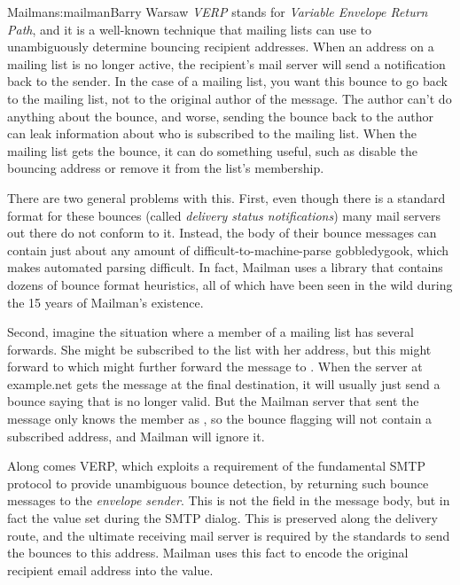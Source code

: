 \begin{aosachapter}{Mailman}{s:mailman}{Barry Warsaw}
\emph{VERP} stands for \emph{Variable Envelope Return Path}, and it is a well-known
technique that mailing lists can use to unambiguously determine bouncing
recipient addresses.  When an address on a mailing list is no longer active,
the recipient's mail server will send a notification back to the sender.  In
the case of a mailing list, you want this bounce to go back to the mailing
list, not to the original author of the message.  The author can't do anything
about the bounce, and worse, sending the bounce back to the author can leak
information about who is subscribed to the mailing list.  When the mailing
list gets the bounce, it can do something useful, such as disable the bouncing
address or remove it from the list's membership.

There are two general problems with this.  First, even though there is a
standard format for these bounces (called \emph{delivery status notifications})
many mail servers out there do not conform to it.  Instead, the body of their
bounce messages can contain just about any amount of
difficult-to-machine-parse gobbledygook, which makes automated parsing
difficult.  In fact, Mailman uses a library that contains dozens of bounce
format heuristics, all of which have been seen in the wild during the 15 years
of Mailman's existence.

Second, imagine the situation where a member of a mailing list has several
forwards.  She might be subscribed to the list with her 
address, but this might forward to  which might further
forward the message to .  When the server at example.net gets
the message at the final destination, it will usually just send a bounce
saying that  is no longer valid.  But the Mailman server that
sent the message only knows the member as , so the bounce
flagging  will not contain a subscribed address, and Mailman
will ignore it.

Along comes VERP, which exploits a requirement of the fundamental SMTP
protocol to provide unambiguous bounce detection, by returning such bounce
messages to the \emph{envelope sender}.  This is not the  field in the
message body, but in fact the  value set during the SMTP dialog.
This is preserved along the delivery route, and the ultimate receiving mail
server is required by the standards to send the bounces to this address.
Mailman uses this fact to encode the original recipient email address into the
 value.


\end{aosachapter}
